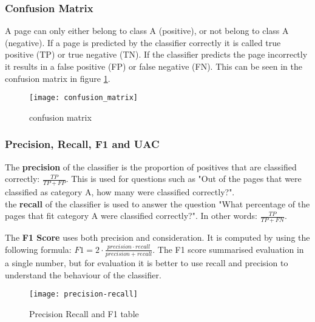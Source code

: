 \subsubsection{Confusion Matrix}
A page can only either belong to class A (positive), or not belong to class A (negative). If a page is predicted by the classifier correctly it is called true positive (TP) or true negative (TN). If the classifier predicts the page incorrectly it results in a false positive (FP) or false negative (FN). This can be seen in the confusion matrix in figure \ref{fig:confusion_matrix}. 

\begin{figure}[ht]
\centering
\texttt{[image: confusion\_matrix]}
\caption{confusion matrix \protect\footnotemark{}}
\label{fig:confusion_matrix}
\end{figure}


\subsubsection{Precision, Recall, F1 and UAC}\label{sec:classification-validation}
The \textbf{precision} of the classifier is the proportion of positives that are classified correctly: $\frac{TP}{TP+FP}$. This is used for questions such as "Out of the pages that were classified as category A, how many were classified correctly?".\\

the \textbf{recall} of the classifier is used to answer the question "What percentage of the pages that fit category A were classified correctly?". In other words: $\frac{TP}{TP+FN}$.

The \textbf{F1 Score} uses both precision and consideration. It is computed by using the following formula: $F1 = 2\cdot \frac{precision \cdot recall}{precision + recall}$. The F1 score summarised evaluation in a single number, but for evaluation it is better to use recall and precision to understand the behaviour of the classifier. \\

\begin{figure}[ht]
\centering
\texttt{[image: precision-recall]}
\caption{Precision Recall and F1 table}
\label{fig:prec-rec}
\end{figure}

